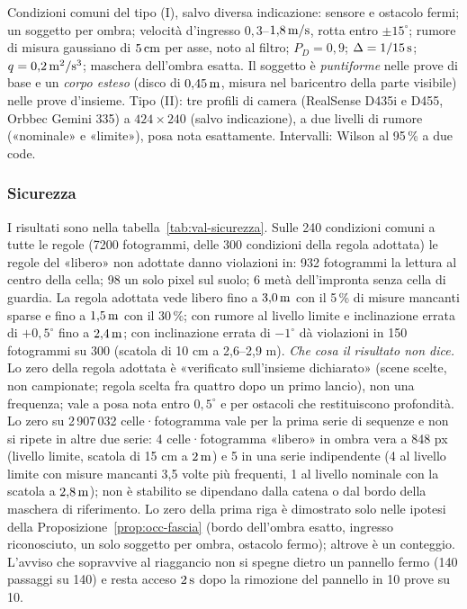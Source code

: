 Condizioni comuni del tipo (I), salvo diversa indicazione: sensore e ostacolo fermi; un soggetto per ombra; velocità d'ingresso $0{,}3$–$1{,}8\,\mathrm{m/s}$, rotta entro $\pm15^\circ$; rumore di misura gaussiano di $5\,\mathrm{cm}$ per asse, noto al filtro; $P_D=0{,}9$; $\Delta=1/15\,\mathrm{s}$; $q=0{,}2\,\mathrm{m^2/s^3}$; maschera dell'ombra esatta. Il soggetto è \emph{puntiforme} nelle prove di base e un \emph{corpo esteso} (disco di $0{,}45\,\mathrm{m}$, misura nel baricentro della parte visibile) nelle prove d'insieme. Tipo (II): tre profili di camera (RealSense D435i e D455, Orbbec Gemini 335) a $424\times240$ (salvo indicazione), a due livelli di rumore («nominale» e «limite»), posa nota esattamente. Intervalli: Wilson al 95\,\% a due code.

\subsubsection*{Sicurezza}

I risultati sono nella tabella~\ref{tab:val-sicurezza}. Sulle 240 condizioni comuni a tutte le regole (7200 fotogrammi, delle 300 condizioni della regola adottata) le regole del «libero» non adottate danno violazioni in: 932 fotogrammi la lettura al centro della cella; 98 un solo pixel sul suolo; 6 metà dell'impronta senza cella di guardia. La regola adottata vede libero fino a $3{,}0\,\mathrm{m}$ con il 5\,\% di misure mancanti sparse e fino a $1{,}5\,\mathrm{m}$ con il 30\,\%; con rumore al livello limite e inclinazione errata di $+0{,}5^\circ$ fino a $2{,}4\,\mathrm{m}$; con inclinazione errata di $-1^\circ$ dà violazioni in 150 fotogrammi su 300 (scatola di 10 cm a 2,6–2,9 m). \emph{Che cosa il risultato non dice.} Lo zero della regola adottata è «verificato sull'insieme dichiarato» (scene scelte, non campionate; regola scelta fra quattro dopo un primo lancio), non una frequenza; vale a posa nota entro $0{,}5^\circ$ e per ostacoli che restituiscono profondità. Lo zero su 2\,907\,032 celle·fotogramma vale per la prima serie di sequenze e non si ripete in altre due serie: 4 celle·fotogramma «libero» in ombra vera a 848 px (livello limite, scatola di 15 cm a $2\,\mathrm{m}$) e 5 in una serie indipendente (4 al livello limite con misure mancanti 3,5 volte più frequenti, 1 al livello nominale con la scatola a $2{,}8\,\mathrm{m}$); non è stabilito se dipendano dalla catena o dal bordo della maschera di riferimento. Lo zero della prima riga è dimostrato solo nelle ipotesi della Proposizione~\ref{prop:occ-fascia} (bordo dell'ombra esatto, ingresso riconosciuto, un solo soggetto per ombra, ostacolo fermo); altrove è un conteggio. L'avviso che sopravvive al riaggancio non si spegne dietro un pannello fermo (140 passaggi su 140) e resta acceso $2\,\mathrm{s}$ dopo la rimozione del pannello in 10 prove su 10.

